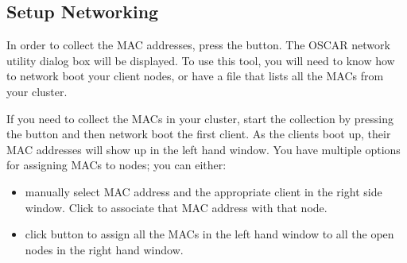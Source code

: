 

\subsection{Setup Networking}
\label{det:setup-networking}


In order to collect the MAC addresses, press the  button. The OSCAR network utility dialog box will be
displayed.  To use this tool, you will need to know how to network
boot your client nodes, or have a file that lists all the MACs from
your cluster.  

If you need to collect the MACs in your cluster, start the collection
by pressing the  button and then network
boot the first client.  As the clients boot up, their MAC addresses
will show up in the left hand window. You have multiple options for
assigning MACs to nodes; you can either:

\begin{itemize}
\item manually select MAC address and the appropriate client in the
  right side window. Click  to associate
  that MAC address with that node.

\item click  button to assign all the MACs in
  the left hand window to all the open nodes in the right hand window.
\end{itemize}

